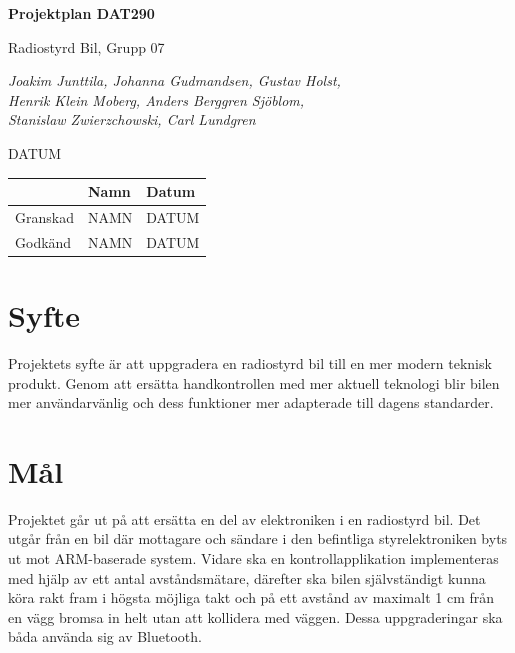 \documentclass[a4paper]{article}
\begin{document}
\begin{titlepage}
\centering
{\bfseries\huge Projektplan DAT290}

\vspace{10mm}

{\Large Radiostyrd Bil, Grupp 07}

\vspace{20mm}

{\Large \itshape{Joakim Junttila, Johanna Gudmandsen, Gustav Holst,\\Henrik Klein Moberg, Anders Berggren Sjöblom, \\[1mm] Stanislaw Zwierzchowski, Carl Lundgren}}

\vspace{10mm}

{DATUM}


\normalsize{
\begin{table}[b]
\centering
\begin{tabular}{|l|l|l|}  \hline
          & \bf Namn & \bf Datum   \\ \hline \hline
 Granskad & NAMN     & DATUM        \\ \hline
 Godkänd  & NAMN     & DATUM         \\ \hline
  \end{tabular}  
  \end{table}}

\end{titlepage}
\newpage
\tableofcontents
\newpage


\section{Syfte}
Projektets syfte är att uppgradera en radiostyrd bil till en mer modern teknisk produkt. Genom att ersätta handkontrollen med mer aktuell teknologi blir bilen mer användarvänlig och dess funktioner mer adapterade till dagens standarder.

\section{Mål}
Projektet går ut på att ersätta en del av elektroniken i en radiostyrd bil. Det utgår från en bil där mottagare och sändare i den befintliga styrelektroniken byts ut mot ARM-baserade system. Vidare ska en kontrollapplikation implementeras med hjälp av ett antal avståndsmätare, därefter ska bilen självständigt kunna köra rakt fram i högsta möjliga takt och på ett avstånd av maximalt 1 cm från en vägg bromsa in helt utan att kollidera med väggen. Dessa uppgraderingar ska båda använda sig av Bluetooth. 
\end{document}
